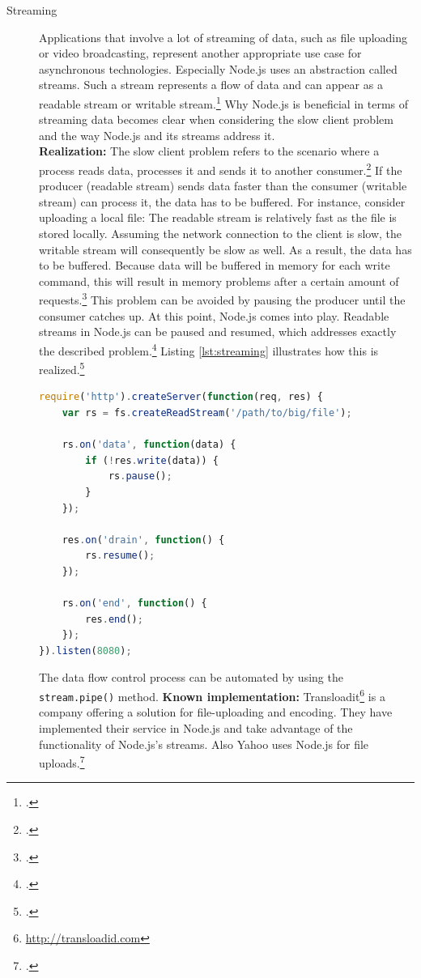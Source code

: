 \begin{description}
\item[Streaming] Applications that involve a lot of streaming of data, such
as file uploading or video broadcasting, represent another appropriate use
case for asynchronous technologies. Especially Node.js uses an abstraction
called streams. Such a stream represents a flow of data and can appear as a
readable stream or writable stream.\footcite[Cf.][75]{teixeira_2012} Why
Node.js is beneficial in terms of streaming data becomes clear when
considering the slow client problem and the way Node.js and its streams
address it.\\
\textbf{Realization:} The slow client problem refers to the scenario where a
process reads data, processes it and sends it to another consumer.\footcite[Cf.][80]{teixeira_2012}
If the producer (readable stream) sends data faster than the consumer (writable stream)
can process it, the data has to be buffered. For instance, consider uploading
a local file: The readable stream is relatively fast as the file is stored locally.
Assuming the network connection to the client is slow, the writable stream will consequently
be slow as well. As a result, the data has to be buffered. Because data will be buffered in
memory for each write command, this will result in memory problems after a certain amount of
requests.\footcite[Cf.][81]{teixeira_2012} This problem can be avoided by pausing the producer
until the consumer catches up. At this point, Node.js comes into play. Readable streams
in Node.js can be paused and resumed, which addresses exactly the described
problem.\footcite[Cf.][81]{teixeira_2012} Listing \ref{lst:streaming} illustrates
how this is realized.\footcite[Cf.][81]{teixeira_2012}

\begin{lstlisting}[language=javascript,caption={Controlling streams in Node.js},label=lst:streaming]
require('http').createServer(function(req, res) {
	var rs = fs.createReadStream('/path/to/big/file');

	rs.on('data', function(data) {
		if (!res.write(data)) {
			rs.pause();
		}
	});

	res.on('drain', function() {
		rs.resume();
	});

	rs.on('end', function() {
		res.end();
	});
}).listen(8080);
\end{lstlisting}


The data flow control process can be automated by using the
\texttt{stream.pipe()} method.
\textbf{Known implementation:}
Transloadit\footnote{\url{http://transloadid.com}} is a company offering a
solution for file-uploading and encoding. They have implemented their service
in Node.js and take advantage of the functionality of Node.js’s streams. Also
Yahoo uses Node.js for file uploads.\footcite[Cf.][]{Odell_2012}



\end{description}
